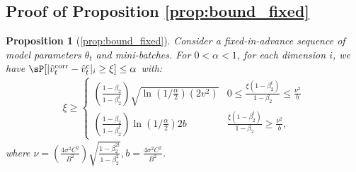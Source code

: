 \documentclass[letterpaper]{article} %
\newtheorem*{proposition*}{Proposition}
\begin{document}
\subsection{Proof of Proposition \ref{prop:bound_fixed}}\label{appendix:bound_fixed}
\begin{proposition*}[\ref{prop:bound_fixed}]
Consider a fixed-in-advance sequence of model parameters $\theta_t$ and mini-batches.
For $0 < \alpha < 1$, for each dimension $i$, we have $\sP[\lvert
 \hat{v}_t^{\textnormal{corr}} - \hat{v}_t^c \rvert_i \geq \xi ] \leq \alpha$ with:
\begin{align*}
    \xi \geq
    \begin{cases}
        (\frac{1-\beta_2}{1-\beta_2^t}) \sqrt{\ln{(1/\frac{\alpha}{2})}(2v^2)}
        & 0 \leq \frac{\xi(1-\beta_2^t)}{1-\beta_2}  \leq \frac{\nu^2}{b} \\
        (\frac{1-\beta_2}{1-\beta_2^t}) \ln{(1/\frac{\alpha}{2})}2b
        & \frac{\xi(1-\beta_2^t)}{1-\beta_2}    \geq \frac{\nu^2}{b},
    \end{cases}
\end{align*}
where $\nu = (\frac{4\sigma^2C^2}{B^2})\sqrt{\frac{1-\beta_2^{2t}}{1-\beta_2^2}}, b=\frac{4\sigma^2C^2}{B^2}$.
\end{proposition*}
\end{document}
